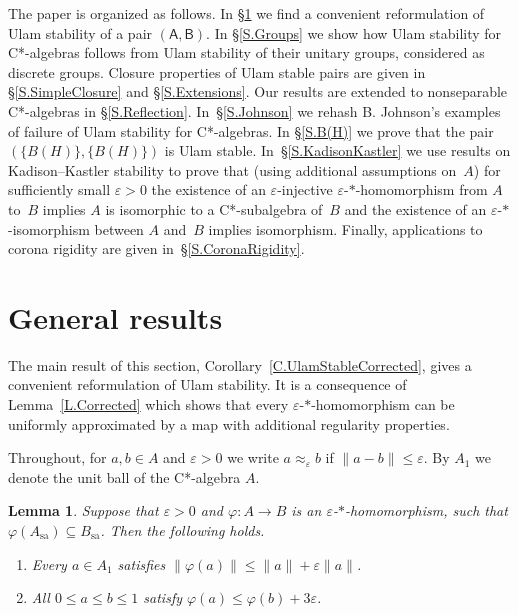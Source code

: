 \documentclass[11pt]{amsproc}
\newcommand{\cstar}{C*}
\newcommand{\sfA}{\mathsf A}
\newcommand{\sfB}{\mathsf B}
\theoremstyle{definition}
\theoremstyle{plain}
\newtheorem{lemma}[definition]{Lemma}
\theoremstyle{remark}
\begin{document}
\medskip
The paper is organized as follows. In \S\ref{S.General} we find a convenient reformulation of Ulam stability of a pair $(\sfA,\sfB)$. In \S\ref{S.Groups} we show how Ulam stability for \cstar-algebras follows from Ulam stability of their unitary groups, considered as discrete groups. Closure properties of Ulam stable pairs are given in \S\ref{S.SimpleClosure} and \S\ref{S.Extensions}.  Our results are extended to nonseparable \cstar-algebras in \S\ref{S.Reflection}.  In~\S\ref{S.Johnson} we rehash B. Johnson's examples of failure of Ulam stability for \cstar-algebras. 
In \S\ref{S.B(H)} we prove that the pair $(\{B(H)\}, \{B(H)\})$ is Ulam stable.  In~\S\ref{S.KadisonKastler} we use results on Kadison--Kastler stability to prove that (using additional assumptions on~$A$) for sufficiently small $\varepsilon>0$ the existence of an $\varepsilon$-injective $\varepsilon$-$*$-homomorphism from $A$ to~$B$ implies $A$ is isomorphic to a \cstar-subalgebra of~$B$ and the existence of an $\varepsilon$-$*$-isomorphism between $A$ and~$B$ implies isomorphism. Finally, applications to corona rigidity are given in~\S\ref{S.CoronaRigidity}. 	

\section{General results} 
\label{S.General}


The main result of this section, Corollary~\ref{C.UlamStableCorrected}, gives a convenient reformulation of Ulam stability. It is a consequence of Lemma~\ref{L.Corrected} which shows  that every $\varepsilon$-$*$-homomorphism can be uniformly approximated by a map with additional regularity properties. 

\medskip

Throughout, for $a,b\in A$ and $\varepsilon>0$ we write $a\approx_\varepsilon b$ if $\|a-b\|\leq \varepsilon$. By $A_1$ we denote the unit ball of the \cstar-algebra $A$. 


\begin{lemma}\label{L.approx.continuity} 
	Suppose that $\varepsilon>0$ and $\varphi\colon A\to B$ is an $\varepsilon$-$*$-homomorphism, such that $\varphi(A_{\textrm{sa}})\subseteq B_{\textrm{sa}}$. Then the following holds. 
	\begin{enumerate}
		\item 	 \label{1.approx} Every $a\in A_1$ satisfies $\|\varphi(a)\|\leq \|a\|+\varepsilon \|a\|$. 
		\item \label{2.approx} All $0\leq a\leq b\leq 1$ satisfy $\varphi(a)\leq \varphi(b)+3\varepsilon$.
	\end{enumerate}
\end{lemma}
\end{document}

